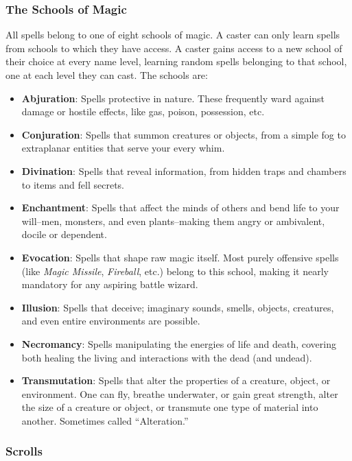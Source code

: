\documentclass{article}
\begin{document}
\begin{multicols}{2}
\subsubsection{The Schools of Magic}\label{the-schools-of-magic}

All spells belong to one of eight schools of magic. A caster can only
learn spells from schools to which they have access. A caster gains
access to a new school of their choice at every name level, learning
random spells belonging to that school, one at each level they can cast.
The schools are:

\begin{itemize}
\tightlist
\item
  \textbf{Abjuration}: Spells protective in nature. These frequently
  ward against damage or hostile effects, like gas, poison, possession,
  etc.
\item
  \textbf{Conjuration}: Spells that summon creatures or objects, from a
  simple fog to extraplanar entities that serve your every whim.
\item
  \textbf{Divination}: Spells that reveal information, from hidden traps
  and chambers to items and fell secrets.
\item
  \textbf{Enchantment}: Spells that affect the minds of others and bend
  life to your will--men, monsters, and even plants--making them angry
  or ambivalent, docile or dependent.
\item
  \textbf{Evocation}: Spells that shape raw magic itself. Most purely
  offensive spells (like \emph{Magic Missile}, \emph{Fireball}, etc.)
  belong to this school, making it nearly mandatory for any aspiring
  battle wizard.
\item
  \textbf{Illusion}: Spells that deceive; imaginary sounds, smells,
  objects, creatures, and even entire environments are possible.
\item
  \textbf{Necromancy}: Spells manipulating the energies of life and
  death, covering both healing the living and interactions with the dead
  (and undead).
\item
  \textbf{Transmutation}: Spells that alter the properties of a
  creature, object, or environment. One can fly, breathe underwater, or
  gain great strength, alter the size of a creature or object, or
  transmute one type of material into another. Sometimes called
  ``Alteration.''
\end{itemize}

\subsubsection{Scrolls}\label{scrolls}


\end{multicols}
\end{document}
